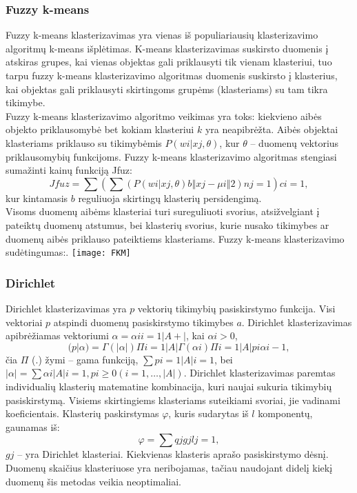 \documentclass{VUMIFInfKursinis}
\begin{document}
\subsubsection{Fuzzy k-means}
Fuzzy k-means klasterizavimas yra vienas iš populiariausių klasterizavimo algoritmų k-means išplėtimas. K-means klasterizavimas suskirsto duomenis į atskiras grupes, kai vienas objektas gali priklausyti tik vienam klasteriui, tuo tarpu fuzzy k-means klasterizavimo algoritmas duomenis suskirsto į klasterius, kai objektas gali priklausyti skirtingoms grupėms (klasteriams) su tam tikra tikimybe.\\
Fuzzy k-means klasterizavimo algoritmo veikimas yra toks: kiekvieno aibės objekto priklausomybė bet kokiam klasteriui $k$ yra neapibrėžta. Aibės objektai klasteriams priklauso su tikimybėmis $P(wi | xj, \theta)$, kur $\theta$ – duomenų vektorius priklausomybių funkcijoms. Fuzzy k-means klasterizavimo algoritmas stengiasi sumažinti kainų funkciją Jfuz:
\begin{equation}
	Jfuz=\sum{(\sum{(P(wi|xj,\theta)b‖xj−μi‖2)}nj=1)}ci = 1,
\end{equation}
kur kintamasis $b$ reguliuoja skirtingų klasterių persidengimą.\\
Visoms duomenų aibėms klasteriai turi sureguliuoti svorius, atsižvelgiant į pateiktų duomenų atstumus, bei klasterių svorius, kurie nusako tikimybes ar duomenų aibės priklauso pateiktiems klasteriams. Fuzzy k-means klasterizavimo sudėtingumas:.
\texttt{[image: FKM]}

\subsubsection{Dirichlet}
Dirichlet klasterizavimas yra $p$ vektorių tikimybių pasiskirstymo funkcija. Visi vektoriai $p$ atspindi duomenų pasiskirstymo tikimybes $a$. Dirichlet klasterizavimas apibrėžiamas vektoriumi $ \alpha = {\alpha i}i=1|A+|$, kai $ \alpha i > 0$,\\
\begin{equation}
	(p|\alpha)=\Gamma(|\alpha|)\Pi i=1|A|\Gamma (\alpha i)\Pi i=1|A|pi \alpha i−1,
\end{equation}
čia $\Pi$ (.) žymi – gama funkciją, $\sum{pi=1|A|i=1}$, bei $|\alpha| = \sum{\alpha i|A|i=1,pi≥0} (i =1,\ldots,|A|)$.
Dirichlet klasterizavimas paremtas individualių klasterių matematine kombinacija, kuri naujai sukuria tikimybių pasiskirstymą. Visiems skirtingiems klasteriams suteikiami svoriai, jie vadinami koeficientais. Klasterių paskirstymas $\varphi$, kuris sudarytas iš $l$ komponentų, gaunamas iš:
\begin{equation}
	\varphi = \sum{qjgjlj=1},
\end{equation}
$gj$ – yra Dirichlet klasteriai. Kiekvienas klasteris aprašo pasiskirstymo dėsnį. Duomenų skaičius klasteriuose yra neribojamas, tačiau naudojant didelį kiekį duomenų šis metodas veikia neoptimaliai.
\end{document}
